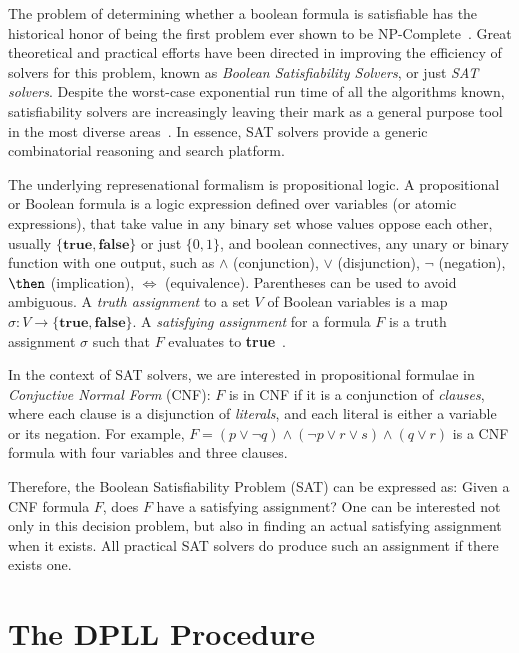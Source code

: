 The problem of determining whether a boolean formula is satisfiable has the
historical honor of being the first problem ever shown to be
NP-Complete~\cite{Cook}. Great theoretical and practical efforts have been directed
in improving the efficiency of solvers for this problem, known as \emph{Boolean
Satisfiability Solvers}, or just \emph{SAT solvers}. Despite the worst-case
exponential run time of all the algorithms known, satisfiability solvers are
increasingly leaving their mark as a general purpose tool in the most diverse
areas~\cite{satchapter}. In essence, SAT solvers provide a generic combinatorial
reasoning and search platform. 

The underlying represenational formalism is propositional logic. A propositional
or Boolean formula is a logic expression defined over variables (or atomic
expressions), that take value in any binary set whose values oppose each other,
usually $\{\textbf{true}, \textbf{false}\}$ or just $\{0,1\}$, and boolean
connectives, any unary or binary function with one output, such as
$\land$ (conjunction), $\lor$ (disjunction), $\neg$ (negation), $\then$
(implication), $\iff$ (equivalence). Parentheses can be used to avoid ambiguous.
A \emph{truth assignment} to a set $V$ of Boolean variables is a map $\sigma : V
\rightarrow \{\textbf{true}, \textbf{false}\}$. A \emph{satisfying assignment}
for a formula $F$ is a truth assignment $\sigma$ such that $F$ evaluates to
\textbf{true}~\cite{satchapter}.

In the context of SAT solvers, we are interested in propositional formulae in
\emph{Conjuctive Normal Form} (CNF): $F$ is in CNF if it is a conjunction of
\emph{clauses}, where each clause is a disjunction of \emph{literals}, and each
literal is either a variable or its negation. For example, $F = (p \lor \neg q)
\land (\neg p \lor r \lor s) \land (q \lor r)$ is a CNF formula with four variables and
three clauses.

Therefore, the Boolean Satisfiability Problem (SAT) can be expressed as: Given a
CNF formula $F$, does $F$ have a satisfying assignment? One can be interested
not only in this decision problem, but also in finding an actual satisfying
assignment when it exists. All practical SAT solvers do produce such an
assignment if there exists one.

\section{The DPLL Procedure}
\label{sec:dpll}

